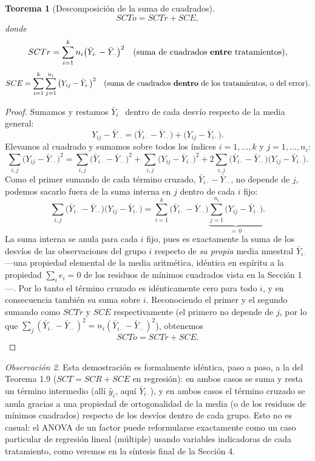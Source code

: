 \documentclass[11pt,a4paper]{article}
\theoremstyle{plain}
\newtheorem{teorema}{Teorema}[section]
\theoremstyle{definition}
\theoremstyle{remark}
\newtheorem{observacion}[teorema]{Observación}
\begin{document}
\begin{teorema}[Descomposición de la suma de cuadrados]
\[
SCTo = SCTr+SCE,
\]
donde
\[
SCTr = \sum_{i=1}^k n_i\big(\bar Y_{i\cdot}-\bar Y_{\cdot\cdot}\big)^2 \quad \text{(suma de cuadrados \textbf{entre} tratamientos)},
\]
\[
SCE = \sum_{i=1}^k\sum_{j=1}^{n_i} \big(Y_{ij}-\bar Y_{i\cdot}\big)^2 \quad \text{(suma de cuadrados \textbf{dentro} de los tratamientos, o del error)}.
\]
\end{teorema}

\begin{proof}
Sumamos y restamos $\bar Y_{i\cdot}$ dentro de cada desvío respecto de la media general:
\[
Y_{ij}-\bar Y_{\cdot\cdot} = \big(\bar Y_{i\cdot}-\bar Y_{\cdot\cdot}\big) + \big(Y_{ij}-\bar Y_{i\cdot}\big).
\]
Elevamos al cuadrado y sumamos sobre todos los índices $i=1,\dots,k$ y $j=1,\dots,n_i$:
\[
\sum_{i,j}\big(Y_{ij}-\bar Y_{\cdot\cdot}\big)^2 = \sum_{i,j}\big(\bar Y_{i\cdot}-\bar Y_{\cdot\cdot}\big)^2 + \sum_{i,j}\big(Y_{ij}-\bar Y_{i\cdot}\big)^2 + 2\sum_{i,j}\big(\bar Y_{i\cdot}-\bar Y_{\cdot\cdot}\big)\big(Y_{ij}-\bar Y_{i\cdot}\big).
\]
Como el primer sumando de cada término cruzado, $\bar Y_{i\cdot}-\bar Y_{\cdot\cdot}$, no depende de $j$, podemos sacarlo fuera de la suma interna en $j$ dentro de cada $i$ fijo:
\[
\sum_{i,j}\big(\bar Y_{i\cdot}-\bar Y_{\cdot\cdot}\big)\big(Y_{ij}-\bar Y_{i\cdot}\big) = \sum_{i=1}^k \big(\bar Y_{i\cdot}-\bar Y_{\cdot\cdot}\big) \underbrace{\sum_{j=1}^{n_i}\big(Y_{ij}-\bar Y_{i\cdot}\big)}_{=\,0}.
\]
La suma interna se anula para cada $i$ fijo, pues es exactamente la suma de los desvíos de las observaciones del grupo $i$ respecto de \emph{su propia} media muestral $\bar Y_{i\cdot}$ —una propiedad elemental de la media aritmética, idéntica en espíritu a la propiedad $\sum_ie_i=0$ de los residuos de mínimos cuadrados vista en la Sección 1—. Por lo tanto el término cruzado es idénticamente cero para todo $i$, y en consecuencia también su suma sobre $i$. Reconociendo el primer y el segundo sumando como $SCTr$ y $SCE$ respectivamente (el primero no depende de $j$, por lo que $\sum_j(\bar Y_{i\cdot}-\bar Y_{\cdot\cdot})^2=n_i(\bar Y_{i\cdot}-\bar Y_{\cdot\cdot})^2$), obtenemos
\[
SCTo = SCTr+SCE.
\]
\end{proof}

\begin{observacion}
Esta demostración es formalmente idéntica, paso a paso, a la del Teorema 1.9 ($SCT=SCR+SCE$ en regresión): en ambos casos se suma y resta un término intermedio (allí $\hat y_i$, aquí $\bar Y_{i\cdot}$), y en ambos casos el término cruzado se anula gracias a una propiedad de ortogonalidad de la media (o de los residuos de mínimos cuadrados) respecto de los desvíos dentro de cada grupo. Esto no es casual: el ANOVA de un factor puede reformularse exactamente como un caso particular de regresión lineal (múltiple) usando variables indicadoras de cada tratamiento, como veremos en la síntesis final de la Sección 4.
\end{observacion}
\end{document}
